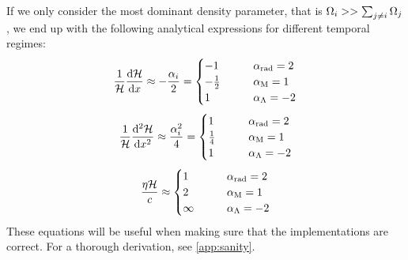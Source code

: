     If we only consider the most dominant density parameter, that is $\Omega_i >> \sum_{j\neq i}\Omega_j$, we end up with the following analytical expressions for different temporal regimes:
    \begin{equation}
        \label{eq:m1:theory:sanity:first_deriv_sanity}
        \frac{1}{\mathcal{H}}\dv{\mathcal{H}}{x} \approx - \frac{\alpha_i}{2} = 
        \begin{cases}
            -1 \qquad &\alpha_\mathrm{rad} = 2 \\
            -\frac{1}{2} \qquad &\alpha_\mathrm{M} = 1\\
            1 \qquad &\alpha_\Lambda = -2
        \end{cases}
    \end{equation}
    \begin{equation}
        \label{eq:m1:theory:sanity:second_deriv_sanity}
        \frac{1}{\mathcal{H}}\dv[2]{\mathcal{H}}{x} \approx \frac{\alpha_i^2}{4} = 
        \begin{cases}
            1 \qquad &\alpha_\mathrm{rad} = 2 \\
            \frac{1}{4} \qquad &\alpha_\mathrm{M} = 1\\
            1 \qquad &\alpha_\Lambda = -2
        \end{cases}
    \end{equation}
    \begin{equation}
        \label{eq:m1:theory:sanity:eta_sanity}
        \frac{\eta\mathcal{H}}{c} \approx 
        \begin{cases}
            1 \qquad &\alpha_\mathrm{rad} = 2 \\
            2 \qquad &\alpha_\mathrm{M} = 1\\
            \infty \qquad &\alpha_\Lambda = -2
        \end{cases}
    \end{equation}
    These equations will be useful when making sure that the implementations are correct. For a thorough derivation, see \cref{app:sanity}.



